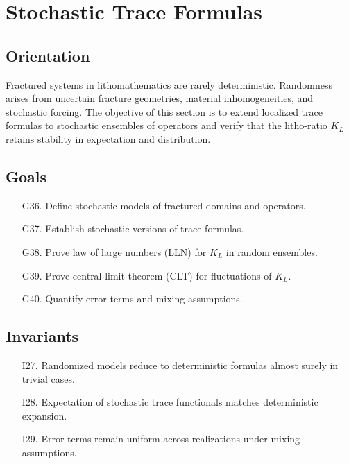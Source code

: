 \section{Stochastic Trace Formulas}
\label{sec:stochastic-traces}

\subsection*{Orientation}

Fractured systems in lithomathematics are rarely deterministic.  
Randomness arises from uncertain fracture geometries, material inhomogeneities, and stochastic forcing.  
The objective of this section is to extend localized trace formulas to stochastic ensembles of operators and verify that the litho-ratio $K_L$ retains stability in expectation and distribution.  

\subsection*{Goals}

\begin{itemize}
  \item[G36.] Define stochastic models of fractured domains and operators. 
  \item[G37.] Establish stochastic versions of trace formulas. 
  \item[G38.] Prove law of large numbers (LLN) for $K_L$ in random ensembles. 
  \item[G39.] Prove central limit theorem (CLT) for fluctuations of $K_L$. 
  \item[G40.] Quantify error terms and mixing assumptions. 
\end{itemize}

\subsection*{Invariants}

\begin{itemize}
  \item[I27.] Randomized models reduce to deterministic formulas almost surely in trivial cases. 
  \item[I28.] Expectation of stochastic trace functionals matches deterministic expansion. 
  \item[I29.] Error terms remain uniform across realizations under mixing assumptions. 
\end{itemize}

